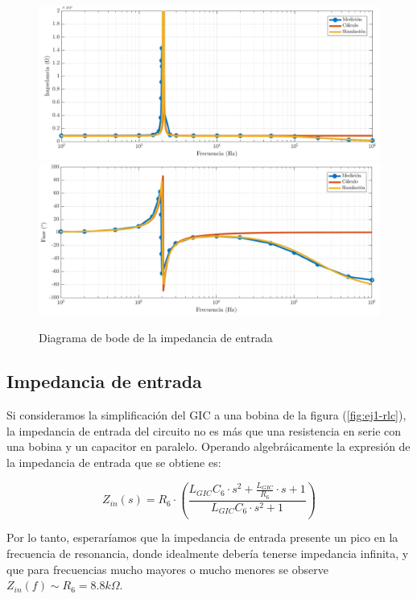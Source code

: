 \documentclass[../../tc_tp3_main.tex]{subfiles}
\begin{document}
\begin{figure}[h!]
	\centering
  	\includegraphics[scale = 0.5]{imagenes/tc_tp3_ej1_zin_x1_mag.png}
  	\includegraphics[scale = 0.5]{imagenes/tc_tp3_ej1_zin_x1_fase.png}
  	\caption{Diagrama de bode de la impedancia de entrada}
  	\label{fig:1-zin}
\end{figure}


\subsection{Impedancia de entrada}


Si consideramos la simplificaci\'on del GIC a una bobina de la figura (\ref{fig:ej1-rlc}), la impedancia de entrada del circuito no es m\'as que una resistencia en serie con una bobina y un capacitor en paralelo. Operando algebr\'aicamente la expresi\'on de la impedancia de entrada que se obtiene es:

\begin{equation}
	Z_{in}(s) = R_6 \cdot \left( \frac{L_{GIC}C_6 \cdot s^2 + \frac{L_{GIC}}{R_6} \cdot s + 1}{L_{GIC}C_6 \cdot s^2 +1} \right) 
\end{equation}

Por lo tanto, esperar\'iamos que la impedancia de entrada presente un pico en la frecuencia de resonancia, donde idealmente deber\'ia tenerse impedancia infinita, y que para frecuencias mucho mayores o mucho menores se observe $Z_{in}(f) \sim R_6 = 8.8k\Omega$.\par
\end{document}
